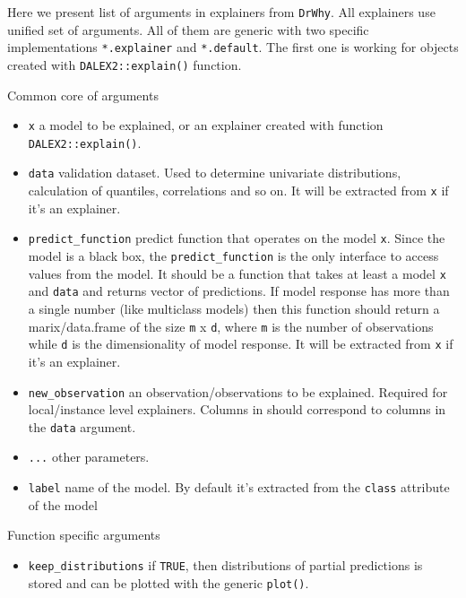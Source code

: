 \documentclass[]{krantz}
\providecommand{\tightlist}{%
  \setlength{\itemsep}{0pt}\setlength{\parskip}{0pt}}
\theoremstyle{definition}
\theoremstyle{definition}
\theoremstyle{definition}
\theoremstyle{remark}
\begin{document}
Here we present list of arguments in explainers from \texttt{DrWhy}. All
explainers use unified set of arguments. All of them are generic with
two specific implementations \texttt{*.explainer} and
\texttt{*.default}. The first one is working for objects created with
\texttt{DALEX2::explain()} function.

Common core of arguments

\begin{itemize}
\tightlist
\item
  \texttt{x} a model to be explained, or an explainer created with
  function \texttt{DALEX2::explain()}.
\item
  \texttt{data} validation dataset. Used to determine univariate
  distributions, calculation of quantiles, correlations and so on. It
  will be extracted from \texttt{x} if it's an explainer.
\item
  \texttt{predict\_function} predict function that operates on the model
  \texttt{x}. Since the model is a black box, the
  \texttt{predict\_function} is the only interface to access values from
  the model. It should be a function that takes at least a model
  \texttt{x} and \texttt{data} and returns vector of predictions. If
  model response has more than a single number (like multiclass models)
  then this function should return a marix/data.frame of the size
  \texttt{m} x \texttt{d}, where \texttt{m} is the number of
  observations while \texttt{d} is the dimensionality of model response.
  It will be extracted from \texttt{x} if it's an explainer.
\item
  \texttt{new\_observation} an observation/observations to be explained.
  Required for local/instance level explainers. Columns in should
  correspond to columns in the \texttt{data} argument.
\item
  \texttt{...} other parameters.
\item
  \texttt{label} name of the model. By default it's extracted from the
  \texttt{class} attribute of the model
\end{itemize}

Function specific arguments

\begin{itemize}
\tightlist
\item
  \texttt{keep\_distributions} if \texttt{TRUE}, then distributions of
  partial predictions is stored and can be plotted with the generic
  \texttt{plot()}.
\end{itemize}


\end{document}
